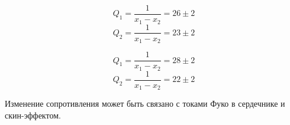 \[
    Q_{1} = \frac{1}{x_{1} - x_{2}} = 26 \pm 2
\]
\[
    Q_{2} = \frac{1}{x_{1} - x_{2}} = 23\pm 2 
\]

\begin{figure}[ht!]
\end{figure}

\[
    Q_{1} = \frac{1}{x_{1}-x_{2}} = 28\pm 2
\]
\[
    Q_{2} = \frac{1}{x_{1}-x_{2}} = 22\pm 2
\]

\begin{figure}[ht!]
\end{figure}

Изменение сопротивления может быть связано с токами Фуко в сердечнике и скин-эффектом.

\begin{figure}[ht!]
\end{figure}

